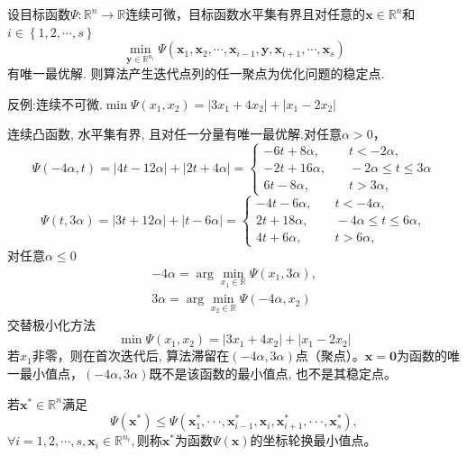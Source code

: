 \begin{theorem}
    设目标函数$\Psi:\mathbb{R}^{n}\to\mathbb{R}$连续可微，目标函数水平集有界且对任意的$\boldsymbol{x}\in\mathbb{R}^n$和$i\in\left\{ 1,2,\cdots,s \right\}$
    \[
        \operatorname*{min}_{\boldsymbol{y}\in\mathbb{R}^{n_{i}}}\Psi(\boldsymbol{x}_{1},\boldsymbol{x}_{2},\cdots,\boldsymbol{x}_{i-1},\boldsymbol{y},\boldsymbol{x}_{i+1},\cdots,\boldsymbol{x}_{s})
    \]
    有唯一最优解. 则算法产生迭代点列的任一聚点为优化问题的稳定点.
\end{theorem}
\begin{example}
    反例:连续不可微.$\min\Psi(x_1,x_2)=|3x_1+4x_2|+|x_1-2x_2|$
    \begin{solution}
        连续凸函数, 水平集有界, 且对任一分量有唯一最优解.对任意$\alpha>0$，
        \[
            \Psi(-4\alpha,t)=|4t-12\alpha|+|2t+4\alpha|=
            \begin{cases}-6t+8\alpha,&\quad t<-2\alpha,\\
                -2t+16\alpha,&\quad-2\alpha\leqslant t\leqslant 3\alpha\\
                6t-8\alpha,&\quad t>3\alpha,
            \end{cases}
        \]
        \[
            \Psi(t,3\alpha)=|3t+12\alpha|+|t-6\alpha|=
            \begin{cases}
                -4t-6\alpha,&\quad t<-4\alpha,\\
                2t+18\alpha,&\quad-4\alpha\leqslant t\leqslant6\alpha,\\
                4t+6\alpha,&\quad t>6\alpha,
            \end{cases}
        \]
        对任意$\alpha\leqslant 0$
        \[
            \begin{array}{l}
                -4\alpha=\arg\min_{x_{1}\in \mathbb{R}}\Psi(x_{1},3\alpha),\\3\alpha=\arg\min_{x_{2}\in \mathbb{R}}\Psi(-4\alpha,x_{2})
            \end{array}
        \]
        交替极小化方法
        \[
            \min\Psi(x_{1},x_{2})=|3x_{1}+4x_{2}|+|x_{1}-2x_{2}|
        \]
        若$x_1$非零，则在首次迭代后, 算法滞留在\colorbox{cyan!50}{$(-4\alpha,3\alpha)$点（聚点）}。\newline$\boldsymbol{x} = \boldsymbol{0}$为函数的唯一最小值点，$(-4\alpha,3\alpha)$既不是该函数的最小值点, 也不是其稳定点。
    \end{solution}    
\end{example}
\begin{definition}[坐标轮换最小值点]
    若$\boldsymbol{x}^*\in\mathbb{R}^n$满足
    \[
        \Psi(\boldsymbol{x}^*)\leqslant\Psi(\boldsymbol{x}_1^*,\cdotp\cdotp\cdotp,\boldsymbol{x}_{i-1}^*,\boldsymbol{x}_i,\boldsymbol{x}_{i+1}^*,\cdotp\cdotp\cdotp,\boldsymbol{x}_s^*),
    \]
    $\forall i=1,2,\cdots,s,\boldsymbol{x}_i\in\mathbb{R}^{n_i},$则称$\boldsymbol{x}^*$为函数$\Psi(\boldsymbol{x})$的坐标轮换最小值点。
\end{definition}
